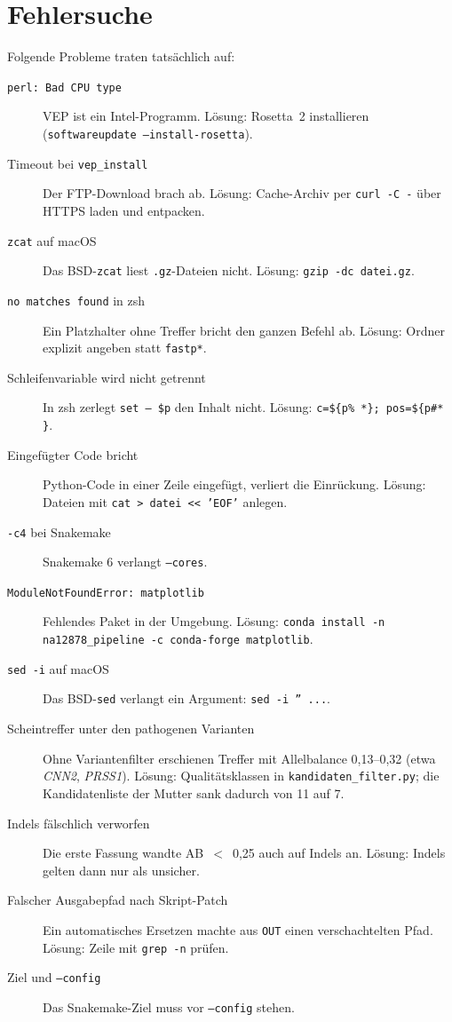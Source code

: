 \documentclass[10pt,a4paper,twocolumn]{article}
\newcommand{\gene}[1]{\textit{#1}}
\begin{document}
\section{Fehlersuche}
Folgende Probleme traten tatsächlich auf:
\begin{description}
\item[\texttt{perl: Bad CPU type}] VEP ist ein Intel-Programm. Lösung: Rosetta~2 installieren (\texttt{softwareupdate --install-rosetta}).
\item[Timeout bei \texttt{vep\_install}] Der FTP-Download brach ab. Lösung: Cache-Archiv per \texttt{curl -C -} über HTTPS laden und entpacken.
\item[\texttt{zcat} auf macOS] Das BSD-\texttt{zcat} liest \texttt{.gz}-Dateien nicht. Lösung: \texttt{gzip -dc datei.gz}.
\item[\texttt{no matches found} in zsh] Ein Platzhalter ohne Treffer bricht den ganzen Befehl ab. Lösung: Ordner explizit angeben statt \texttt{fastp*}.
\item[Schleifenvariable wird nicht getrennt] In zsh zerlegt \texttt{set -- \$p} den Inhalt nicht. Lösung: \texttt{c=\$\{p\% *\}; pos=\$\{p\#* \}}.
\item[Eingefügter Code bricht] Python-Code in einer Zeile eingefügt, verliert die Einrückung. Lösung: Dateien mit \texttt{cat > datei << 'EOF'} anlegen.
\item[\texttt{-c4} bei Snakemake] Snakemake 6 verlangt \texttt{--cores}.
\item[\texttt{ModuleNotFoundError: matplotlib}] Fehlendes Paket in der Umgebung. Lösung: \texttt{conda install -n na12878\_pipeline -c conda-forge matplotlib}.
\item[\texttt{sed -i} auf macOS] Das BSD-\texttt{sed} verlangt ein Argument: \texttt{sed -i '' ...}.
\item[Scheintreffer unter den pathogenen Varianten] Ohne Variantenfilter erschienen Treffer mit Allelbalance 0,13--0,32 (etwa \gene{CNN2}, \gene{PRSS1}). Lösung: Qualitätsklassen in \texttt{kandidaten\_filter.py}; die Kandidatenliste der Mutter sank dadurch von 11 auf 7.
\item[Indels fälschlich verworfen] Die erste Fassung wandte AB~$<$~0,25 auch auf Indels an. Lösung: Indels gelten dann nur als \glqq unsicher\grqq{}.
\item[Falscher Ausgabepfad nach Skript-Patch] Ein automatisches Ersetzen machte aus \texttt{OUT} einen verschachtelten Pfad. Lösung: Zeile mit \texttt{grep -n} prüfen.
\item[Ziel und \texttt{--config}] Das Snakemake-Ziel muss vor \texttt{--config} stehen.
\end{description}
 
\end{document}
